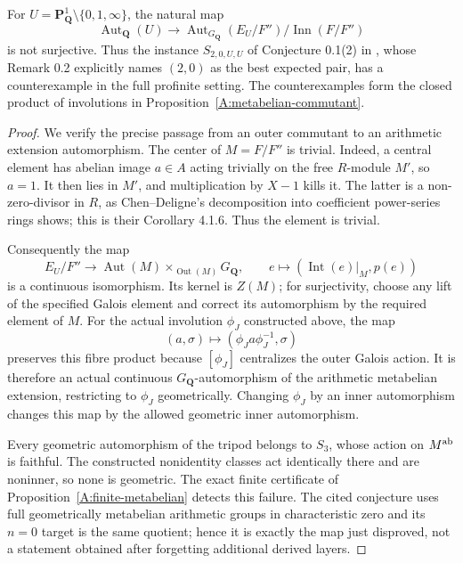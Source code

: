 \begin{corollary}
\label{A:strong-metabelian-counterexample}
For $U=\mathbf P^1_{\mathbf Q}\setminus\{0,1,\infty\}$,
the natural map
\[
 \operatorname{Aut}_{\mathbf Q}(U)\longrightarrow
 \operatorname{Aut}_{G_{\mathbf Q}}(E_U/F'')/\operatorname{Inn}(F/F'')
\]
is not surjective. Thus the instance $S_{2,0,U,U}$ of
Conjecture 0.1(2) in \cite{A_Yamaguchi2024}, whose
Remark 0.2 explicitly names $(2,0)$ as the best expected
pair, has a counterexample in the full profinite setting.
The counterexamples form the closed product of involutions
in Proposition~\ref{A:metabelian-commutant}.
\end{corollary}
\begin{proof}
We verify the precise passage from an outer commutant to an
arithmetic extension automorphism. The center of $M=F/F''$
is trivial. Indeed, a central element has abelian image
$a\in A$ acting trivially on the free $R$-module $M'$, so
$a=1$. It then lies in $M'$, and multiplication by $X-1$
kills it. The latter is a non-zero-divisor in $R$, as
Chen--Deligne's decomposition into coefficient power-series
rings shows; this is their Corollary 4.1.6. Thus the element
is trivial.

Consequently the map
\[
 E_U/F''\longrightarrow
 \operatorname{Aut}(M)\times_{\operatorname{Out}(M)}G_{\mathbf Q},
 \qquad e\longmapsto(\operatorname{Int}(e)|_M,p(e))
\]
is a continuous isomorphism. Its kernel is $Z(M)$; for
surjectivity, choose any lift of the specified Galois element
and correct its automorphism by the required element of $M$.
For the actual involution $\phi_J$ constructed above, the map
\[
             (a,\sigma)\longmapsto
                   (\phi_Ja\phi_J^{-1},\sigma)
\]
preserves this fibre product because $[\phi_J]$ centralizes
the outer Galois action. It is therefore an actual continuous
$G_{\mathbf Q}$-automorphism of the arithmetic metabelian
extension, restricting to $\phi_J$ geometrically. Changing
$\phi_J$ by an inner automorphism changes this map by the
allowed geometric inner automorphism.

Every geometric automorphism of the tripod belongs to $S_3$,
whose action on $M^{\rm ab}$ is faithful. The constructed
nonidentity classes act identically there and are noninner,
so none is geometric. The exact finite certificate of
Proposition~\ref{A:finite-metabelian} detects this failure.
The cited conjecture uses full geometrically metabelian
arithmetic groups in characteristic zero and its $n=0$
target is the same quotient; hence it is exactly the map
just disproved, not a statement obtained after forgetting
additional derived layers.
\end{proof}

